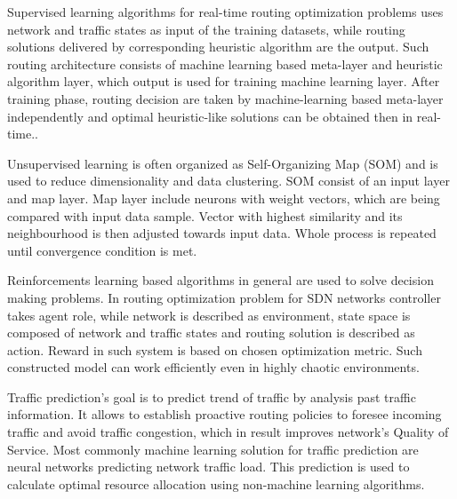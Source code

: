 \documentclass[conference]{IEEEtran}
\begin{document}
Supervised learning algorithms for real-time routing optimization problems uses network and traffic states as input of the training datasets, while routing solutions delivered by corresponding heuristic algorithm are the output. Such routing architecture consists of machine learning based meta-layer and heuristic algorithm layer, which output is used for training machine learning layer. After training phase, routing decision are taken by machine-learning based meta-layer independently and optimal heuristic-like solutions can be obtained then in real-time.\cite{routing3}.\par\newpage
Unsupervised learning is often organized as Self-Organizing Map (SOM) and is used to reduce dimensionality and data clustering. SOM consist of an input layer and map layer. Map layer include neurons with weight vectors, which are being compared with input data sample. Vector with highest similarity and its neighbourhood is then adjusted towards input data. Whole process is repeated until convergence condition is met\cite{routing3}.\par
Reinforcements learning based algorithms in general are used to solve decision making problems. In routing optimization problem for SDN networks controller takes agent role, while network is described as environment, state space is composed of network and traffic states and routing solution is described as action. Reward in such system is based on chosen optimization metric. Such constructed model can work efficiently even in highly chaotic environments\cite{routing3}.\par
Traffic prediction's goal is to predict trend of traffic by analysis past traffic information. It allows to establish proactive routing policies to foresee incoming traffic and avoid traffic congestion, which in result improves network's Quality of Service. Most commonly machine learning solution for traffic prediction are neural networks predicting network traffic load. This prediction is used to calculate optimal resource allocation using non-machine learning algorithms\cite{routing3}.\par
\end{document}
